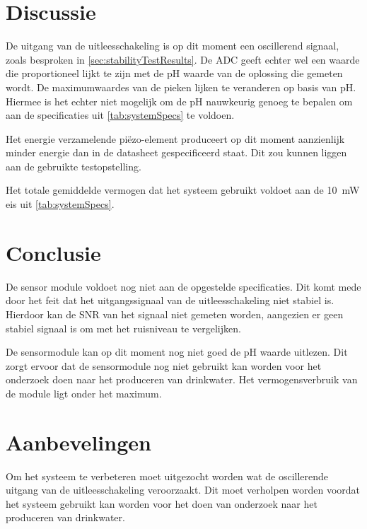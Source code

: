 \section{Discussie}
De uitgang van de uitleesschakeling is op dit moment een oscillerend signaal, zoals besproken in \cref{sec:stabilityTestResults}. De ADC geeft echter wel een waarde die proportioneel lijkt te zijn met de pH waarde van de oplossing die gemeten wordt.
De maximumwaardes van de pieken lijken te veranderen op basis van pH. Hiermee is het echter niet mogelijk om de pH nauwkeurig genoeg te bepalen om aan de specificaties uit \cref{tab:systemSpecs} te voldoen.

Het energie verzamelende piëzo-element produceert op dit moment aanzienlijk minder energie dan in de datasheet gespecificeerd staat. Dit zou kunnen liggen aan de gebruikte testopstelling.

Het totale gemiddelde vermogen dat het systeem gebruikt voldoet aan de \qty{10}{\milli\watt} eis uit \cref{tab:systemSpecs}.

\newpage
\section{Conclusie}
De sensor module voldoet nog niet aan de opgestelde specificaties. Dit komt mede door het feit dat het uitgangssignaal van de uitleesschakeling niet stabiel is. Hierdoor kan de SNR van het signaal niet gemeten worden, aangezien er geen stabiel signaal is om met het ruisniveau te vergelijken.


De sensormodule kan op dit moment nog niet goed de pH waarde uitlezen. Dit zorgt ervoor dat de sensormodule nog niet gebruikt kan worden voor het onderzoek doen naar het produceren van drinkwater. Het vermogensverbruik van de module ligt onder het maximum.



\newpage
\section{Aanbevelingen}
Om het systeem te verbeteren moet uitgezocht worden wat de oscillerende uitgang van de uitleesschakeling veroorzaakt. Dit moet verholpen worden voordat het systeem gebruikt kan worden voor het doen van onderzoek naar het produceren van drinkwater.

